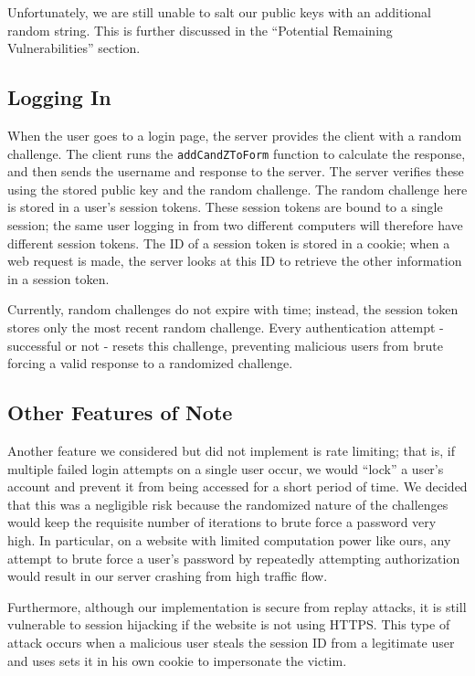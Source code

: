 \documentclass[11pt]{article}
\begin{document}
Unfortunately, we are still unable to salt our public keys with an additional random string. This is further discussed in the ``Potential Remaining Vulnerabilities'' section.

\subsection{Logging In}

When the user goes to a login page, the server provides the client with a random challenge. The client runs the \texttt{addCandZToForm} function to calculate the response, and then sends the username and response to the server. The server verifies these using the stored public key and the random challenge.
The random challenge here is stored in a user's session tokens. These session tokens are bound to a single session; the same user logging in from two different computers will therefore have different session tokens. The ID of a session token is stored in a cookie; when a web request is made, the server looks at this ID to retrieve the other information in a session token.

Currently, random challenges do not expire with time; instead, the session token stores only the most recent random challenge. Every authentication attempt - successful or not - resets this challenge, preventing malicious users from brute forcing a valid response to a randomized challenge.

\subsection{Other Features of Note}

Another feature we considered but did not implement is rate limiting; that is, if multiple failed login attempts on a single user occur, we would ``lock'' a user's account and prevent it from being accessed for a short period of time. We decided that this was a negligible risk because the randomized nature of the challenges would keep the requisite number of iterations to brute force a password very high. In particular, on a website with limited computation power like ours, any attempt to brute force a user's password by repeatedly attempting authorization would result in our server crashing from high traffic flow.

Furthermore, although our implementation is secure from replay attacks, it is still vulnerable to session hijacking if the website is not using HTTPS. This type of attack occurs when a malicious user steals the session ID from a legitimate user and uses sets it in his own cookie to impersonate the victim.
\end{document}
